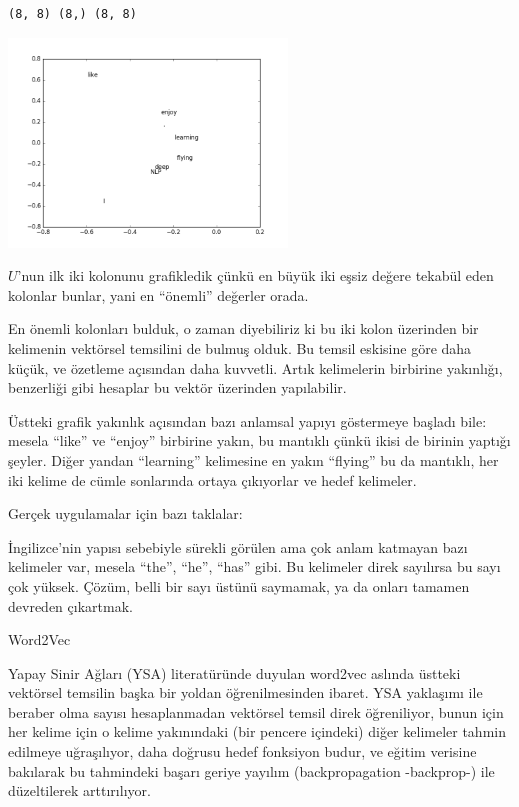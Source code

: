 \documentclass[12pt,fleqn]{article}\usepackage{../../common}
\begin{document}
\begin{verbatim}
(8, 8) (8,) (8, 8)
\end{verbatim}

\includegraphics[width=20em]{svd_8.png}

$U$'nun ilk iki kolonunu grafikledik çünkü en büyük iki eşsiz değere
tekabül eden kolonlar bunlar, yani en ``önemli'' değerler orada. 

En önemli kolonları bulduk, o zaman diyebiliriz ki bu iki kolon üzerinden
bir kelimenin vektörsel temsilini de bulmuş olduk. Bu temsil eskisine göre
daha küçük, ve özetleme açısından daha kuvvetli. Artık kelimelerin
birbirine yakınlığı, benzerliği gibi hesaplar bu vektör üzerinden
yapılabilir. 

Üstteki grafik yakınlık açısından bazı anlamsal yapıyı göstermeye başladı
bile: mesela ``like'' ve ``enjoy'' birbirine yakın, bu mantıklı çünkü ikisi
de birinin yaptığı şeyler. Diğer yandan ``learning'' kelimesine en yakın
``flying'' bu da mantıklı, her iki kelime de cümle sonlarında ortaya
çıkıyorlar ve hedef kelimeler. 

Gerçek uygulamalar için bazı taklalar: 

İngilizce'nin yapısı sebebiyle sürekli görülen ama çok anlam katmayan bazı
kelimeler var, mesela ``the'', ``he'', ``has'' gibi. Bu kelimeler direk
sayılırsa bu sayı çok yüksek. Çözüm, belli bir sayı üstünü saymamak, ya da
onları tamamen devreden çıkartmak.

Word2Vec

Yapay Sinir Ağları (YSA) literatüründe duyulan word2vec aslında üstteki
vektörsel temsilin başka bir yoldan öğrenilmesinden ibaret. YSA yaklaşımı
ile beraber olma sayısı hesaplanmadan vektörsel temsil direk öğreniliyor,
bunun için her kelime için o kelime yakınındaki (bir pencere içindeki)
diğer kelimeler tahmin edilmeye uğraşılıyor, daha doğrusu hedef fonksiyon
budur, ve eğitim verisine bakılarak bu tahmindeki başarı geriye yayılım
(backpropagation -backprop-) ile düzeltilerek arttırılıyor. 
\end{document}
